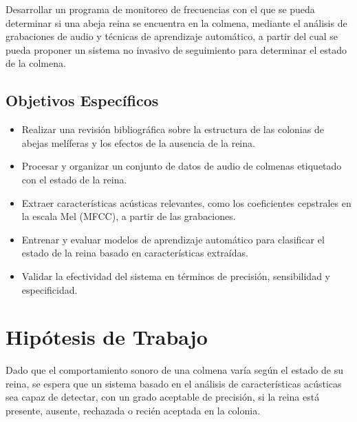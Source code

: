 \documentclass[12pt]{report}
\newenvironment{tightmulticols}{%
  \begin{multicols}{2}
  \setlength{\parskip}{0pt}
  \setlength{\parindent}{0em}
  \linespread{1}\selectfont
}{%
  \end{multicols}
}
\begin{document}
\begin{tightmulticols}
\par Desarrollar un programa de monitoreo de frecuencias con el que se pueda determinar si una abeja reina se encuentra en la colmena, mediante el análisis de grabaciones de audio y técnicas de aprendizaje automático, a partir del cual se pueda proponer un sistema no invasivo de seguimiento para determinar el estado de la colmena.

\subsection{Objetivos Específicos}

\begin{itemize}
    \item[\ding{43}] Realizar una revisión bibliográfica sobre la estructura de las colonias de abejas melíferas y los efectos de la ausencia de la reina.
    \item[\ding{43}] Procesar y organizar un conjunto de datos de audio de colmenas etiquetado con el estado de la reina.
    \item[\ding{43}] Extraer características acústicas relevantes, como los coeficientes cepstrales en la escala Mel (MFCC), a partir de las grabaciones.
    \item[\ding{43}] Entrenar y evaluar modelos de aprendizaje automático para clasificar el estado de la reina basado en características extraídas.
    \item[\ding{43}] Validar la efectividad del sistema en términos de precisión, sensibilidad y especificidad.
\end{itemize}

\section{Hipótesis de Trabajo}

\par Dado que el comportamiento sonoro de una colmena varía según el estado de su reina, se espera que un sistema basado en el análisis de características acústicas sea capaz de detectar, con un grado aceptable de precisión, si la reina está presente, ausente, rechazada o recién aceptada en la colonia.

\end{tightmulticols}

\end{document}
